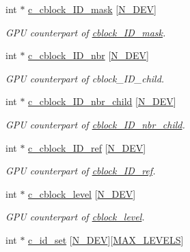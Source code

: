 \begin{DoxyCompactItemize}
int $\ast$ \hyperlink{classMesh_a74c11972ade088c320d82e2b219d924e}{c\+\_\+cblock\+\_\+\+I\+D\+\_\+mask} \mbox{[}\hyperlink{cppspec_8h_a2b674dab7a14f1bf32b48b7fda5022dc}{N\+\_\+\+D\+EV}\mbox{]}
\begin{DoxyCompactList}\small\item\em G\+PU counterpart of \hyperlink{classMesh_ac9cda8833eb008b6a99988e18fd09960}{cblock\+\_\+\+I\+D\+\_\+mask}. \end{DoxyCompactList}\item 
int $\ast$ \hyperlink{classMesh_a73ae287026f89ed3a1e8fc9ca22958b0}{c\+\_\+cblock\+\_\+\+I\+D\+\_\+nbr} \mbox{[}\hyperlink{cppspec_8h_a2b674dab7a14f1bf32b48b7fda5022dc}{N\+\_\+\+D\+EV}\mbox{]}
\begin{DoxyCompactList}\small\item\em G\+PU counterpart of cblock\+\_\+\+I\+D\+\_\+child. \end{DoxyCompactList}\item 
int $\ast$ \hyperlink{classMesh_abecfa6150231142125696a3a4db0d9b2}{c\+\_\+cblock\+\_\+\+I\+D\+\_\+nbr\+\_\+child} \mbox{[}\hyperlink{cppspec_8h_a2b674dab7a14f1bf32b48b7fda5022dc}{N\+\_\+\+D\+EV}\mbox{]}
\begin{DoxyCompactList}\small\item\em G\+PU counterpart of \hyperlink{classMesh_abb8b2b9b54bc8d342bd5db602063f133}{cblock\+\_\+\+I\+D\+\_\+nbr\+\_\+child}. \end{DoxyCompactList}\item 
int $\ast$ \hyperlink{classMesh_a061a8950733957c307b6b352c19120b2}{c\+\_\+cblock\+\_\+\+I\+D\+\_\+ref} \mbox{[}\hyperlink{cppspec_8h_a2b674dab7a14f1bf32b48b7fda5022dc}{N\+\_\+\+D\+EV}\mbox{]}
\begin{DoxyCompactList}\small\item\em G\+PU counterpart of \hyperlink{classMesh_a4bc1d7b73f4d7fdae4f547eef4684b7b}{cblock\+\_\+\+I\+D\+\_\+ref}. \end{DoxyCompactList}\item 
int $\ast$ \hyperlink{classMesh_a883a91c4cf0446f344115ccbb3bc2f65}{c\+\_\+cblock\+\_\+level} \mbox{[}\hyperlink{cppspec_8h_a2b674dab7a14f1bf32b48b7fda5022dc}{N\+\_\+\+D\+EV}\mbox{]}
\begin{DoxyCompactList}\small\item\em G\+PU counterpart of \hyperlink{classMesh_ab5fd345e916788a1add5c7da96526b16}{cblock\+\_\+level}. \end{DoxyCompactList}\item 
int $\ast$ \hyperlink{classMesh_ae4bc3c2c0013415db58fa77623b21ca5}{c\+\_\+id\+\_\+set} \mbox{[}\hyperlink{cppspec_8h_a2b674dab7a14f1bf32b48b7fda5022dc}{N\+\_\+\+D\+EV}\mbox{]}\mbox{[}\hyperlink{cppspec_8h_add784659439a8dd6b1423406171414d3}{M\+A\+X\+\_\+\+L\+E\+V\+E\+LS}\mbox{]}

\end{DoxyCompactItemize}
